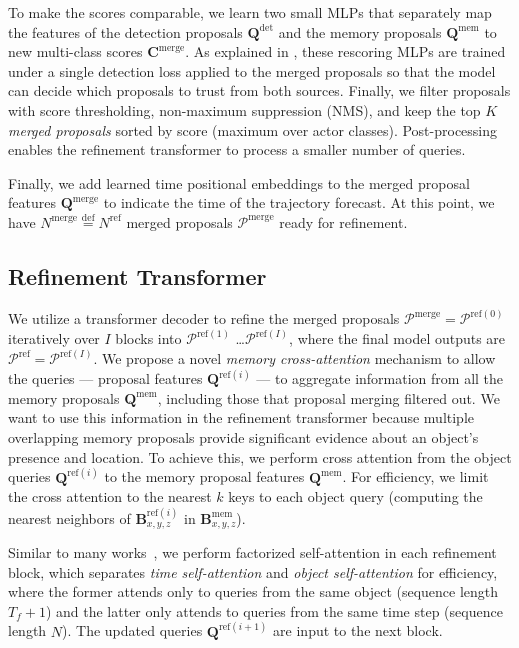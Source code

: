 To make the scores comparable, we learn two small MLPs that separately map the features of the detection proposals $\mathbf{Q}^\mathrm{det}$ and the memory proposals $\mathbf{Q}^\mathrm{mem}$
to new multi-class scores $\mathbf{C}^\mathrm{merge}$.
As explained in ,
these rescoring MLPs are trained under a single detection loss applied to the merged proposals so that the model can decide which proposals to trust from both sources.
Finally, we filter proposals with score thresholding, non-maximum suppression (NMS), and keep the top $K$
\textit{merged proposals} sorted by score (maximum over actor classes).
Post-processing enables the refinement transformer to process a smaller number of queries.

Finally, we add learned time positional embeddings to the merged proposal features $\mathbf{Q}^\mathrm{merge}$
to indicate the time of the trajectory forecast.
At this point, we have $N^\mathrm{merge} \overset{\mathrm{def}}{=} N^\mathrm{ref}$ merged proposals $\mathcal{P}^\mathrm{merge}$ ready for refinement.

\subsection{Refinement Transformer}
We utilize a transformer decoder to refine the merged proposals $\mathcal{P}^\mathrm{merge} = \mathcal{P}^{\mathrm{ref}(0)}$
iteratively over $I$ blocks into $\mathcal{P}^{\mathrm{ref}(1)}$ \dots $\mathcal{P}^{\mathrm{ref}(I)}$,
where the final model outputs are $\mathcal{P}^\mathrm{ref} = \mathcal{P}^{\mathrm{ref}(I)}$.
We propose a novel \textit{memory cross-attention}
mechanism to allow the queries --- proposal features $\mathbf{Q}^{\mathrm{ref}(i)}$ --- to aggregate information from all the memory proposals $\mathbf{Q}^{\mathrm{mem}}$,
including those that proposal merging filtered out.
We want to use this information in the refinement transformer because multiple overlapping memory proposals provide significant evidence about an object's presence and location.
To achieve this, we perform cross attention from the object queries $\mathbf{Q}^{\mathrm{ref}(i)}$ to the memory proposal features $\mathbf{Q}^\mathrm{mem}$.
For efficiency, we limit the cross attention to the nearest $k$ keys to each object query (computing the nearest neighbors of $\mathbf{B}^{\mathrm{ref}(i)}_{x, y, z}$ in $\mathbf{B}^{\mathrm{mem}}_{x, y, z}$).

Similar to many works~\cite{ngiam2021scene,casas2024detra}, we perform factorized self-attention in each refinement block, which separates \textit{time self-attention} and \textit{object self-attention} for efficiency, where the former attends only to queries from the same object (sequence length $T_f + 1$) and the latter only attends to queries from the same time step (sequence length $N$).
The updated queries $\mathbf{Q}^{\mathrm{ref}(i+1)}$ are input to the next block.

